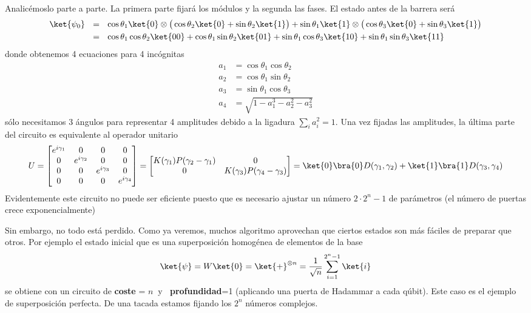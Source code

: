 \documentclass[a4paper,11pt]{book} %
\numberwithin{equation}{chapter}
\begin{document}
Analicémoslo parte a parte. La primera parte fijará los módulos y la segunda las fases. El estado antes de la barrera será
	\begin{align*}
	\ket{\psi_0}~~ 
	&= ~~ \cos\theta_1 \ket{0}\otimes \big( \cos\theta_2 \ket{0} + \sin\theta_2\ket{1}\big) 
		+ \sin\theta_1\ket{1}\otimes \big(\cos\theta_3\ket{0} + \sin\theta_3\ket{1}\big) \\
	&= ~~ \cos\theta_1 \cos\theta_2 \ket{00} + \cos\theta_1\sin\theta_2\ket{01} + \sin\theta_1\cos\theta_3\ket{10} 
		+ \sin\theta_1\sin\theta_3\ket{11} 
	\end{align*}
donde obtenemos 4 ecuaciones para 4 incógnitas
	\begin{align*}
	a_1 &=  \cos\theta_1 \cos\theta_2  \\
	a_2 &=  \cos\theta_1\sin\theta_2   \\
	a_3 &=  \sin\theta_1\cos\theta_3   \\
	a_4 &=  \sqrt{1-a_1^3-a_2^2-a_3^2}
	\end{align*}
sólo necesitamos 3 ángulos para representar 4 amplitudes debido a la ligadura $\sum_i a_i^2 = 1$.
Una vez fijadas las amplitudes, la última parte del circuito es equivalente al  operador unitario
	$$
	U = 
	\begin{bmatrix} 
		e^{i\gamma_1} & 0 & 0 & 0    \\ 
		0 & e^{i\gamma_2} & 0 & 0    \\ 
		0 & 0 & e^{i\gamma_3} & 0    \\ 
		0 & 0 & 0 & e^{i\gamma_4} 
	\end{bmatrix} = 
	\begin{bmatrix} 
		K(\gamma_1)P(\gamma_2-\gamma_1) & 0   \\  
		0 &K(\gamma_3) P(\gamma_4-\gamma_3) 
	\end{bmatrix}  
	= \ket{0}\bra{0}D(\gamma_1,\gamma_2) + \ket{1}\bra{1}D(\gamma_3,\gamma_4)  
	$$
Evidentemente este circuito no puede ser eficiente puesto que es necesario ajustar un número $2\cdot 2^n-1$ de parámetros (el número de puertas crece exponencialmente)

Sin embargo, no todo está perdido. Como ya veremos, muchos algoritmo aprovechan que ciertos estados son más fáciles de preparar que otros.  Por ejemplo el estado inicial que es una superposición homogénea de elementos de la base
$$
\ket{\psi} = W \ket{0}  = \ket{+}^{\otimes n}= \frac{1}{\sqrt{n}}\sum_{i=1}^{2^n-1} \ket{i}
$$
se obtiene con un circuito de  \textbf{coste} = $n~$  y $~$ \textbf{profundidad}=1 (aplicando una puerta de Hadammar a cada qúbit). Este caso es el ejemplo de superposición perfecta. De una tacada estamos fijando los $2^n$ números complejos.
\end{document}
